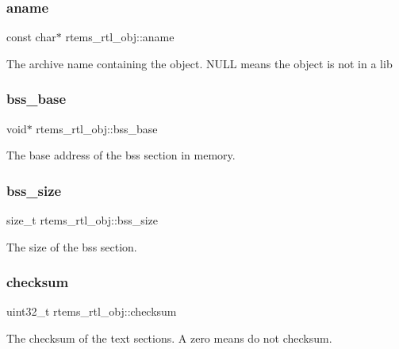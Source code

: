 \subsubsection{\texorpdfstring{aname}{aname}}
{\footnotesize\ttfamily const char$\ast$ rtems\+\_\+rtl\+\_\+obj\+::aname}

The archive name containing the object. N\+U\+LL means the object is not in a lib \mbox{\label{structrtems__rtl__obj_a0290589556c14f3876535186dc9a1c19}} 
\subsubsection{\texorpdfstring{bss\_base}{bss\_base}}
{\footnotesize\ttfamily void$\ast$ rtems\+\_\+rtl\+\_\+obj\+::bss\+\_\+base}

The base address of the bss section in memory. \mbox{\label{structrtems__rtl__obj_a4c38372bdb331ee19f8cc57b342f61af}} 
\subsubsection{\texorpdfstring{bss\_size}{bss\_size}}
{\footnotesize\ttfamily size\+\_\+t rtems\+\_\+rtl\+\_\+obj\+::bss\+\_\+size}

The size of the bss section. \mbox{\label{structrtems__rtl__obj_af15b3ca1e198f3727d90debe8d45df50}} 
\subsubsection{\texorpdfstring{checksum}{checksum}}
{\footnotesize\ttfamily uint32\+\_\+t rtems\+\_\+rtl\+\_\+obj\+::checksum}

The checksum of the text sections. A zero means do not checksum. \mbox{\label{structrtems__rtl__obj_ace0b9903c80f8fe5e504ec2419c18b03}} 
